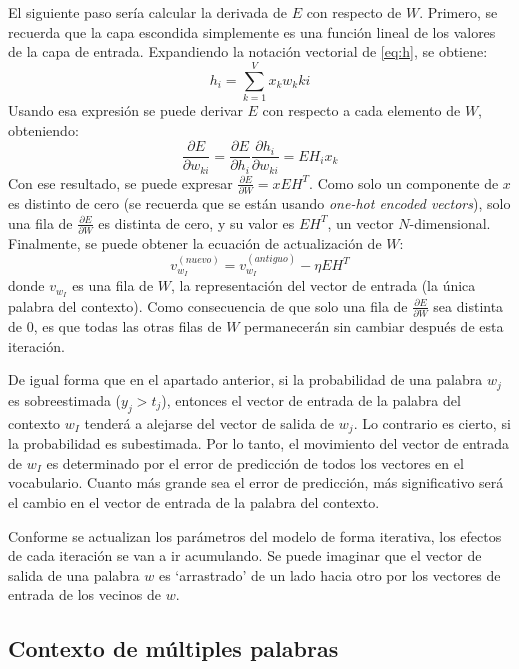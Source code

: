 El siguiente paso sería calcular la derivada de $E$ con respecto de $W$. Primero, se recuerda que la capa escondida simplemente es una función lineal de los valores de la capa de entrada. Expandiendo
la notación vectorial de \ref*{eq:h}, se obtiene:
\begin{equation}
  h_i=\sum_{k=1}^Vx_kw_k{ki}
\end{equation}
Usando esa expresión se puede derivar $E$ con respecto a cada elemento de $W$, obteniendo:
\begin{equation}
  \frac{\partial E}{\partial w_{ki}} = \frac{\partial E}{\partial h_i} \frac{\partial h_i}{\partial w_{ki}} = EH_i x_k
\end{equation}
Con ese resultado, se puede expresar $\frac{\partial E}{\partial W}=xEH^T$. Como solo un componente de $x$ es distinto de cero (se recuerda que se están usando \textit{one-hot encoded vectors}), solo
una fila de $\frac{\partial E}{\partial W}$ es distinta de cero, y su valor es $EH^T$, un vector $N$-dimensional.  Finalmente, se puede obtener la ecuación de actualización de $W$:
\begin{equation}
  v_{w_I}^{(nuevo)} = v_{w_I}^{(antiguo)} - \eta EH^T
\end{equation}
donde $v_{w_I}$ es una fila de $W$, la representación del vector de entrada (la única palabra del contexto). Como consecuencia de que solo una fila de $\frac{\partial E}{\partial W}$ sea distinta de 0,
es que todas las otras filas de $W$ permanecerán sin cambiar después de esta iteración.

De igual forma que en el apartado anterior, si la probabilidad de una palabra $w_j$ es sobreestimada ($y_j>t_j$), entonces el vector de entrada de la palabra del contexto $w_I$ tenderá a alejarse del vector de salida
de $w_j$. Lo contrario es cierto, si la probabilidad es subestimada. Por lo tanto, el movimiento del vector de entrada de $w_I$ es determinado por el error de predicción de todos los vectores en el vocabulario. Cuanto más
grande sea el error de predicción, más significativo será el cambio en el vector de entrada de la palabra del contexto.

Conforme se actualizan los parámetros del modelo de forma iterativa, los efectos de cada iteración se van a ir acumulando. Se puede imaginar que el vector de salida de una palabra $w$ es `arrastrado' de un lado hacia otro
por los vectores de entrada de los vecinos de $w$.
\subsection{Contexto de múltiples palabras}

